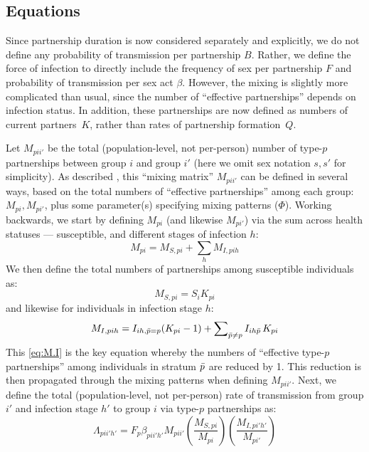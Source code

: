 \subsection{Equations}\label{mod.foi.eq}
Since partnership duration is now considered separately and explicitly,
we do not define any probability of transmission per partnership $B$.
Rather, we define the force of infection to directly include
the frequency of sex per partnership $F$ and probability of transmission per sex act $\beta$.
However, the mixing is slightly more complicated than usual,
since the number of ``effective partnerships'' depends on infection status.
In addition, these partnerships are now defined as numbers of current partners~$K$,
rather than rates of partnership formation~$Q$.
\par
Let $M_{pii'}$ be the total (population-level, not per-person)
number of type-$p$ partnerships between group $i$ and group $i'$
(here we omit sex notation $s,s'$ for simplicity).
As described , this ``mixing matrix'' $M_{pii'}$ can be defined in several ways,
based on the total numbers of ``effective partnerships'' among each group: $M_{pi}, M_{pi'}$,
plus some parameter(s) specifying mixing patterns (\eg $\Phi$).
Working backwards, we start by defining $M_{pi}$ (and likewise $M_{pi'}$) via
the sum across health statuses --- \ie susceptible, and different stages of infection $h$:
\begin{equation}\label{eq:M.SI}
  M_{pi} = M_{S,pi} + \sum_h M_{I,pih}
\end{equation}
We then define the total numbers of partnerships among susceptible individuals as:
\begin{equation}
  M_{S,pi} = S_{i} K_{pi} \label{eq:M.S}
\end{equation}
and likewise for individuals in infection stage $h$:
\begin{equation}
  M_{I,pih} = I_{ih,\bar{p}=p} (K_{pi}-1) + \sum\nolimits_{\bar{p} \ne p} I_{ih\bar{p}}\,K_{pi} \label{eq:M.I}
\end{equation}
This \eqref{eq:M.I} is the key equation whereby
the  numbers of ``effective type-$p$ partnerships'' among
individuals in stratum $\bar{p}$ are reduced by 1.
This reduction is then propagated through the mixing patterns when defining $M_{pii'}$.
Next, we define the total (population-level, not per-person) rate of transmission
from group $i'$ and infection stage $h'$ to group $i$ via type-$p$ partnerships as:
\begin{equation}
  \Lambda_{pii'h'} = F_p \beta_{pii'h'} M_{pii'}
  \left(\frac{M_{S,pi}}{M_{pi}}\right)
  \left(\frac{M_{I,pi'h'}}{M_{pi'}}\right)
\end{equation}

